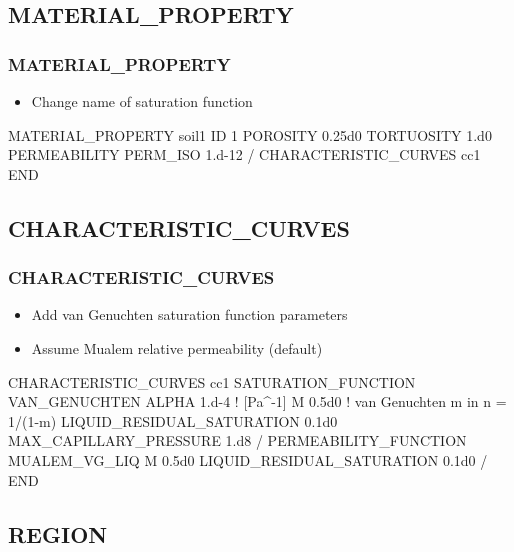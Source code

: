 \documentclass{beamer}
\newcommand\bluecomment[1]{{{\color{blue} #1}}}
\newcommand\magentacomment[1]{{{\color{magenta} #1}}}
\begin{document}
\subsection{MATERIAL\_PROPERTY}

\begin{frame}[fragile]\frametitle{MATERIAL\_PROPERTY}

\begin{itemize}
\item Change name of saturation function
\end{itemize}

\begin{semiverbatim}
MATERIAL_PROPERTY soil1
  ID 1
  POROSITY 0.25d0
  TORTUOSITY 1.d0
  PERMEABILITY
    PERM_ISO 1.d-12
  /
  CHARACTERISTIC\_CURVES \magentacomment{cc1}
END
\end{semiverbatim}

\end{frame}

\subsection{CHARACTERISTIC\_CURVES}

\begin{frame}[fragile]\frametitle{CHARACTERISTIC\_CURVES}

\begin{itemize}
\item Add van Genuchten saturation function parameters
\item Assume Mualem relative permeability (default)
\end{itemize}

\begin{semiverbatim}
CHARACTERISTIC_CURVES cc1
  SATURATION_FUNCTION VAN_GENUCHTEN
    ALPHA  1.d-4    \bluecomment{! [Pa^-1]}
    M 0.5d0         \bluecomment{! van Genuchten m in n = 1/(1-m)}
    LIQUID_RESIDUAL_SATURATION 0.1d0
    MAX_CAPILLARY_PRESSURE 1.d8
  /
  PERMEABILITY_FUNCTION MUALEM_VG_LIQ
    M 0.5d0
    LIQUID_RESIDUAL_SATURATION 0.1d0
  /
END
\end{semiverbatim}

\end{frame}

\subsection{REGION}
\end{document}

